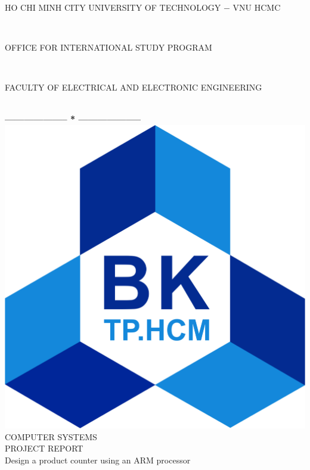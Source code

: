 \documentclass[13pt,a4paper,twoside]{report}
\begin{document}
\fontsize{13pt}{18pt}\selectfont
\begin{titlepage}
\thispagestyle{empty}
\thisfancypage{%
\setlength{\fboxsep}{0pt}%
\fbox}{} %
\

\begin{center}
\begin{large}
HO CHI MINH CITY UNIVERSITY OF TECHNOLOGY $-$ VNU HCMC
\end{large} \\
\begin{large}
OFFICE FOR INTERNATIONAL STUDY PROGRAM
\end{large} \\
\begin{large}
FACULTY OF ELECTRICAL AND ELECTRONIC ENGINEERING
\end{large} \\
\textbf{--------------------  *  --------------------}\\[2.5cm]
\includegraphics[scale=0.1]{logobk.png}\\[1cm]
{\fontsize{20pt}{1}\selectfont 	COMPUTER SYSTEMS}\\[0.2cm]
{\fontsize{20pt}{1}\selectfont PROJECT REPORT}\\[0.2cm]
{\fontsize{20pt}{1}\selectfont Design a product counter using an ARM processor}\\[2.5cm]
\end{center}


\end{titlepage}
\end{document}
